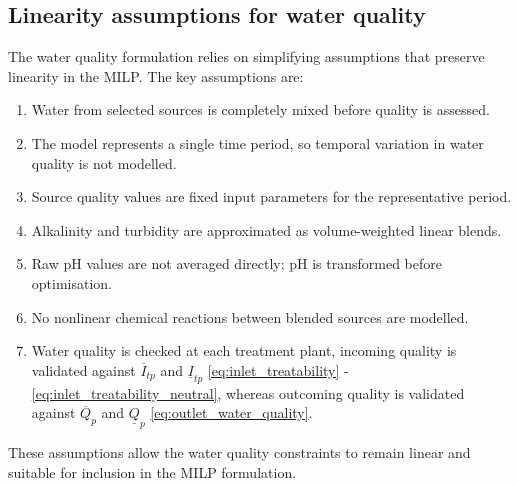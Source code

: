 \subsection{Linearity assumptions for water quality}
\label{sec:model_axiom}
The water quality formulation relies on simplifying assumptions that preserve linearity in the MILP.
The key assumptions are:
\begin{enumerate}[label=(\roman*), align=left, widest=viii]
    \item Water from selected sources is completely mixed before quality is assessed.
    \item The model represents a single time period, so temporal variation in water quality is not modelled.
    \item Source quality values are fixed input parameters for the representative period.
    \item Alkalinity and turbidity are approximated as volume-weighted linear blends.
    \item Raw $\mathrm{pH}$ values are not averaged directly; $\mathrm{pH}$ is transformed before optimisation.
    \item No nonlinear chemical reactions between blended sources are modelled.
    \item Water quality is checked at each treatment plant, incoming quality is validated against $\overline{I}_{tp}$ and $\underline{I}_{tp}$ \eqref{eq:inlet_treatability} - \eqref{eq:inlet_treatability_neutral},
            whereas outcoming quality is validated against $\overline{Q}_p$ and $\underline{Q}_p$ \eqref{eq:outlet_water_quality}.
\end{enumerate}

These assumptions allow the water quality constraints to remain linear and suitable for inclusion in the MILP formulation.

